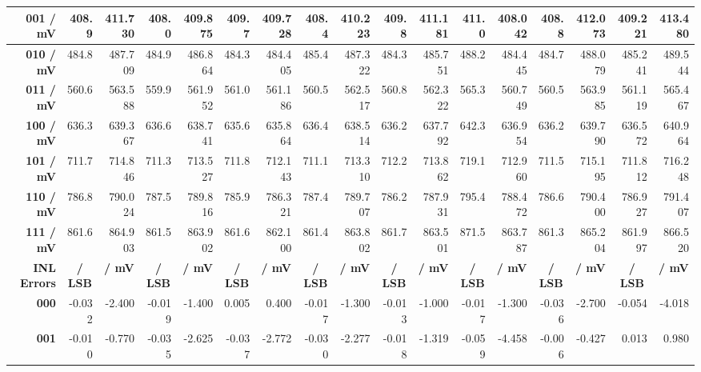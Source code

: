 \documentclass[parskip,oneside,colorbacktitle,10pt,accentcolor=tud1b,table]{tudreport}
\begin{document}
{\begin{table}
\begin{tabular}{|r|r|r|r|r|r|r|r|r|r|r|r|r|r|r|r|r|}
    \hline
    \textbf{001 / mV} & 408.9 & 411.730 & 408.0 & 409.875 & 409.7 & 409.728 & 408.4 & 410.223 & 409.8 & 411.181 & 411.0 & 408.042 & 408.8 & 412.073 & 409.221 & 413.480 \\
    \hline
    \textbf{010 / mV} & 484.8 & 487.709 & 484.9 & 486.864 & 484.3 & 484.405 & 485.4 & 487.322 & 484.3 & 485.751 & 488.2 & 484.445 & 484.7 & 488.079 & 485.241 & 489.544 \\
    \hline
    \textbf{011 / mV} & 560.6 & 563.588 & 559.9 & 561.952 & 561.0 & 561.186 & 560.5 & 562.517 & 560.8 & 562.322 & 565.3 & 560.749 & 560.5 & 563.985 & 561.119 & 565.467 \\
    \hline
    \textbf{100 / mV} & 636.3 & 639.367 & 636.6 & 638.741 & 635.6 & 635.864 & 636.4 & 638.514 & 636.2 & 637.792 & 642.3 & 636.954 & 636.2 & 639.790 & 636.572 & 640.964 \\
    \hline
    \textbf{101 / mV} & 711.7 & 714.846 & 711.3 & 713.527 & 711.8 & 712.143 & 711.1 & 713.310 & 712.2 & 713.862 & 719.1 & 712.960 & 711.5 & 715.195 & 711.812 & 716.248 \\
    \hline
    \textbf{110 / mV} & 786.8 & 790.024 & 787.5 & 789.816 & 785.9 & 786.321 & 787.4 & 789.707 & 786.2 & 787.931 & 795.4 & 788.472 & 786.6 & 790.400 & 786.927 & 791.407 \\
    \hline
    \textbf{111 / mV} & 861.6 & 864.903 & 861.5 & 863.902 & 861.6 & 862.100 & 861.4 & 863.802 & 861.7 & 863.501 & 871.5 & 863.787 & 861.3 & 865.204 & 861.997 & 866.520 \\
    \hline
    \multicolumn{1}{|r}{\textbf{INL Errors}} & \multicolumn{1}{c}{\textbf{/ LSB}} & \multicolumn{1}{c}{\textbf{/ mV}} & \multicolumn{1}{c}{\textbf{/ LSB}} & \multicolumn{1}{c}{\textbf{/ mV}} & \multicolumn{1}{c}{\textbf{/ LSB}} & \multicolumn{1}{c}{\textbf{/ mV}} & \multicolumn{1}{c}{\textbf{/ LSB}} & \multicolumn{1}{c}{\textbf{/ mV}} & \multicolumn{1}{c}{\textbf{/ LSB}} & \multicolumn{1}{c}{\textbf{/ mV}} & \multicolumn{1}{c}{\textbf{/ LSB}} & \multicolumn{1}{c}{\textbf{/ mV}} & \multicolumn{1}{c}{\textbf{/ LSB}} & \multicolumn{1}{c}{\textbf{/ mV}} & \multicolumn{1}{c}{\textbf{/ LSB}} & \multicolumn{1}{c|}{\textbf{/ mV}} \\
    \hline
    \textbf{000} & -0.032 & -2.400 & -0.019 & -1.400 & 0.005 & 0.400 & -0.017 & -1.300 & -0.013 & -1.000 & -0.017 & -1.300 & -0.036 & -2.700 & -0.054 & -4.018 \\
    \hline
    \textbf{001} & -0.010 & -0.770 & -0.035 & -2.625 & -0.037 & -2.772 & -0.030 & -2.277 & -0.018 & -1.319 & -0.059 & -4.458 & -0.006 & -0.427 & 0.013 & 0.980 \\

\end{tabular}
\end{table}}
\end{document}
